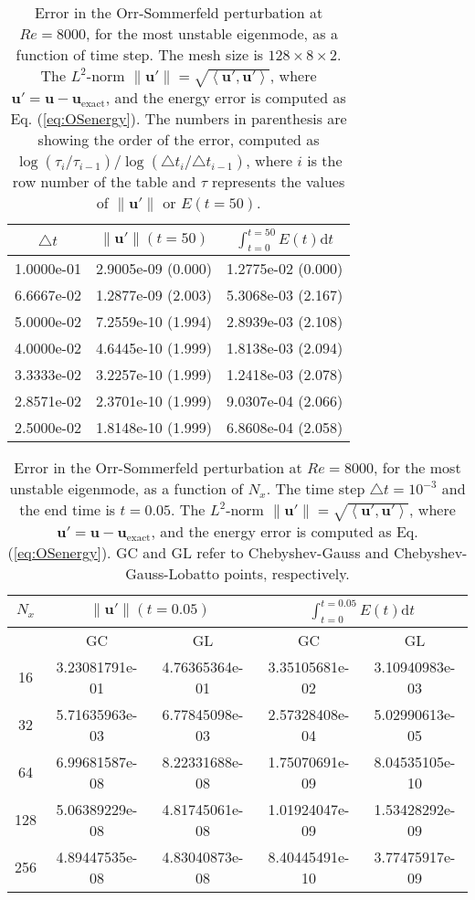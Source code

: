 \documentclass[preprint]{elsarticle}
\begin{document}
\begin{table}
	\centering
	\caption{Error in the Orr-Sommerfeld perturbation at $Re=8000$, for the most unstable eigenmode, as a function of time step. The mesh size is $128 \times 8 \times 2$. The $L^2$-norm $ \| \bm{u}' \| = \sqrt{\left< \bm{u}', \bm{u}'\right>}$, where $\bm{u}'=\bm{u}-\bm{u}_{\mathrm{exact}}$, and the energy error is computed as Eq. (\ref{eq:OSenergy}). The numbers in parenthesis are showing the order of the error, computed as $\log(\tau_i/\tau_{i-1})/\log(\triangle t_i/ \triangle t_{i-1})$, where $i$ is the row number of the table and $\tau$ represents the values of $\|\bm{u}'\|$ or $E(t=50)$.  \label{tab:OS}}
	\begin{tabular}{ccc}	
 $\triangle t$ & $\| \bm{u}' \|(t=50)$ & $\int_{t=0}^{t=50}E(t) \mathrm{d}t$ \\
 \hline

1.0000e-01 & 2.9005e-09  (0.000) & 1.2775e-02 (0.000) \\
6.6667e-02 & 1.2877e-09  (2.003) & 5.3068e-03 (2.167) \\
5.0000e-02 & 7.2559e-10  (1.994) & 2.8939e-03 (2.108) \\
4.0000e-02 & 4.6445e-10  (1.999) & 1.8138e-03 (2.094) \\
3.3333e-02 & 3.2257e-10  (1.999) & 1.2418e-03 (2.078) \\
2.8571e-02 & 2.3701e-10  (1.999) & 9.0307e-04 (2.066) \\
2.5000e-02 & 1.8148e-10  (1.999) & 6.8608e-04 (2.058)
	\end{tabular}
\end{table}

\begin{table}
	\centering
	\caption{Error in the Orr-Sommerfeld perturbation at $Re=8000$, for the most unstable eigenmode, as a function of $N_x$. The time step $\triangle t = 10^{-3}$ and the end time is $t=0.05$. The $L^2$-norm $ \| \bm{u}' \| = \sqrt{\left< \bm{u}', \bm{u}'\right>}$, where $\bm{u}'=\bm{u}-\bm{u}_{\mathrm{exact}}$, and the energy error is computed as Eq. (\ref{eq:OSenergy}). GC and GL refer to Chebyshev-Gauss and Chebyshev-Gauss-Lobatto points, respectively.   \label{tab:OS_spatial}}
	\begin{tabular}{ccccc}	
		$N_x$ & \multicolumn{2}{c}{${\| \bm{u}' \|(t=0.05)}$} & \multicolumn{2}{c}{$\int_{t=0}^{t=0.05}E(t) \mathrm{d}t$} \\
		\hline
			 & GC & GL & GC & GL \\
		\hline
16	&	3.23081791e-01	&	4.76365364e-01	&	3.35105681e-02	&	3.10940983e-03	\\
32	&	5.71635963e-03	&	6.77845098e-03	&	2.57328408e-04	&	5.02990613e-05	\\
64	&	6.99681587e-08	&	8.22331688e-08	&	1.75070691e-09	&	8.04535105e-10	\\
128	&	5.06389229e-08	&	4.81745061e-08	&	1.01924047e-09	&	1.53428292e-09	\\
256	&	4.89447535e-08	&	4.83040873e-08	&	8.40445491e-10	&	3.77475917e-09	
	\end{tabular}
\end{table}
\end{document}
